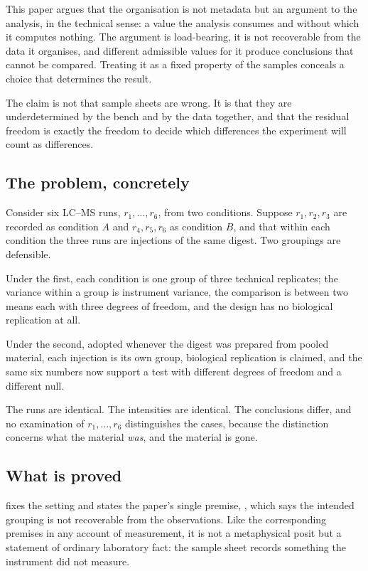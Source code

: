 \documentclass[11pt,a4paper]{article}
\theoremstyle{definition}
\theoremstyle{remark}
\begin{document}
This paper argues that the organisation is not metadata but an argument
to the analysis, in the technical sense: a value the analysis consumes
and without which it computes nothing. The argument is load-bearing, it
is not recoverable from the data it organises, and different admissible
values for it produce conclusions that cannot be compared. Treating it as
a fixed property of the samples conceals a choice that determines the
result.

The claim is not that sample sheets are wrong. It is that they are
underdetermined by the bench and by the data together, and that the
residual freedom is exactly the freedom to decide which differences the
experiment will count as differences.

\subsection{The problem, concretely}

Consider six LC--MS runs, $r_1,\dots,r_6$, from two conditions. Suppose
$r_1,r_2,r_3$ are recorded as condition $A$ and $r_4,r_5,r_6$ as
condition $B$, and that within each condition the three runs are
injections of the same digest. Two groupings are defensible.

Under the first, each condition is one group of three technical
replicates; the variance within a group is instrument variance, the
comparison is between two means each with three degrees of freedom, and
the design has no biological replication at all.

Under the second, adopted whenever the digest was prepared from pooled
material, each injection is its own group, biological replication is
claimed, and the same six numbers now support a test with different
degrees of freedom and a different null.

The runs are identical. The intensities are identical. The conclusions
differ, and no examination of $r_1,\dots,r_6$ distinguishes the cases,
because the distinction concerns what the material \emph{was}, and the
material is gone.

\subsection{What is proved}

 fixes the setting and states the paper's single
premise, , which says the intended grouping is not
recoverable from the observations. Like the corresponding premises in any
account of measurement, it is not a metaphysical posit but a statement of
ordinary laboratory fact: the sample sheet records something the
instrument did not measure.
\end{document}
